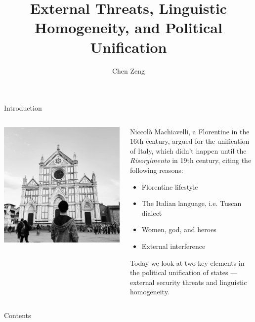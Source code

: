 \documentclass{beamer}
\title[Necessary Conditions of Political Unification]{External Threats, Linguistic Homogeneity, and Political Unification}
\author{Chen Zeng}
\institute[]{Department of Political Science \\ Renmin University of China}
\begin{document}
	\maketitle
	\begin{frame}{Introduction}
		\begin{columns}
			\begin{column}{.4\textwidth}
				\includegraphics[width=\textwidth]{santa_croce.jpg}
			\end{column}
			\begin{column}{.6\textwidth}
				Niccolò Machiavelli, a Florentine in the 16th century, argued for the unification of Italy, which didn't happen until the \textit{Risorgimento} in 19th century, citing the following reasons:
				\begin{itemize}
					\item Florentine lifestyle
					\item The Italian language, i.e. Tuscan dialect
					\item Women, god, and heroes
					\item External interference
				\end{itemize}
				Today we look at two key elements in the political unification of states --- external security threats and linguistic homogeneity.
			\end{column}
		\end{columns}
	\end{frame}
	\begin{frame}{Contents}
		\tableofcontents
	\end{frame}
\end{document}
